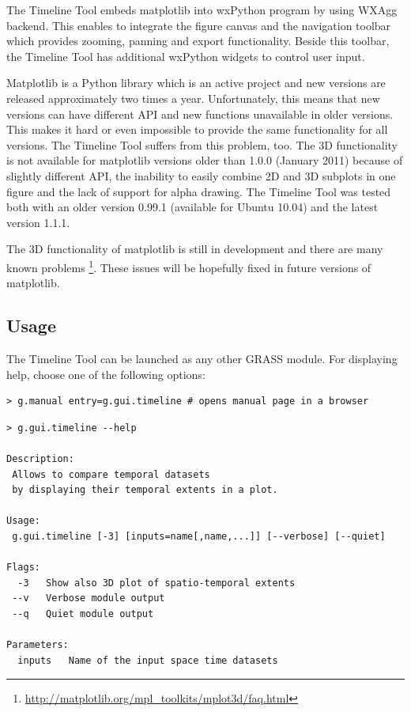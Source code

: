 \documentclass[a4paper,12pt,oneside]{book}
\begin{document}
The Timeline Tool embeds matplotlib into wxPython program by using WXAgg backend.
This enables to integrate the figure canvas and the navigation toolbar
which provides zooming, panning and export functionality.
Beside this toolbar, the Timeline Tool has additional wxPython widgets to control user input.

Matplotlib is a Python library which is an active project and new versions are released approximately two times a year.
Unfortunately, this means that new versions can have different API and new functions unavailable in older versions.
This makes it hard or even impossible to provide the same functionality for all versions.
The Timeline Tool suffers from this problem, too.
The 3D functionality is not available for matplotlib versions older than 1.0.0 (January 2011)
because of slightly different API, the inability to easily combine 2D and 3D subplots in one figure
and the lack of support for alpha drawing.
The Timeline Tool was tested both with an older version 0.99.1 (available for Ubuntu 10.04) and the latest version 1.1.1.

The 3D functionality of matplotlib is still in development and there are many known problems%
\footnote{\url{http://matplotlib.org/mpl_toolkits/mplot3d/faq.html}}.
These issues will be hopefully fixed in future versions of matplotlib.


\subsection{Usage}
The Timeline Tool can be launched as any other GRASS module.
For displaying help, choose one of the following options:
\begin{small}
\begin{lstlisting}[style=mybash]
> g.manual entry=g.gui.timeline # opens manual page in a browser
\end{lstlisting}
\end{small}

\begin{small}
\begin{lstlisting}[style=mybash]
> g.gui.timeline --help

Description:
 Allows to compare temporal datasets
 by displaying their temporal extents in a plot.

Usage:
 g.gui.timeline [-3] [inputs=name[,name,...]] [--verbose] [--quiet]

Flags:
  -3   Show also 3D plot of spatio-temporal extents
 --v   Verbose module output
 --q   Quiet module output

Parameters:
  inputs   Name of the input space time datasets

\end{lstlisting}
\end{small}
\end{document}
